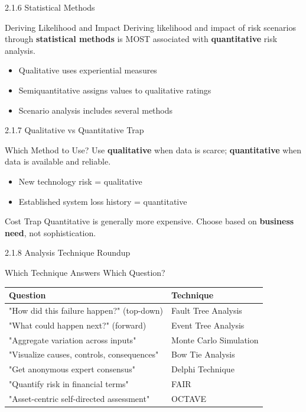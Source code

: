 \documentclass{beamer}
\begin{document}
	\begin{frame}{2.1.6 Statistical Methods}
		\begin{block}{Deriving Likelihood and Impact}
			Deriving likelihood and impact of risk scenarios through \textbf{statistical methods} is MOST associated with \textbf{quantitative} risk analysis.
		\end{block}
		\begin{itemize}
			\item Qualitative uses experiential measures
			\item Semiquantitative assigns values to qualitative ratings
			\item Scenario analysis includes several methods
		\end{itemize}
	\end{frame}
	
	\begin{frame}{2.1.7 Qualitative vs Quantitative Trap}
		\begin{block}{Which Method to Use?}
			Use \textbf{qualitative} when data is scarce; \textbf{quantitative} when data is available and reliable.
		\end{block}
		\begin{itemize}
			\item New technology risk = qualitative
			\item Established system loss history = quantitative
		\end{itemize}
		\begin{alertblock}{Cost Trap}
			Quantitative is generally more expensive. Choose based on \textbf{business need}, not sophistication.
		\end{alertblock}
	\end{frame}
	
	\begin{frame}{2.1.8 Analysis Technique Roundup}
		\begin{block}{Which Technique Answers Which Question?}
			\begin{tabular}{|p{5cm}|p{5cm}|}
				\hline
				\textbf{Question} & \textbf{Technique} \\
				\hline
				"How did this failure happen?" (top-down) & Fault Tree Analysis \\
				\hline
				"What could happen next?" (forward) & Event Tree Analysis \\
				\hline
				"Aggregate variation across inputs" & Monte Carlo Simulation \\
				\hline
				"Visualize causes, controls, consequences" & Bow Tie Analysis \\
				\hline
				"Get anonymous expert consensus" & Delphi Technique \\
				\hline
				"Quantify risk in financial terms" & FAIR \\
				\hline
				"Asset-centric self-directed assessment" & OCTAVE \\
				\hline
			\end{tabular}
		\end{block}
	\end{frame}
	
\end{document}
